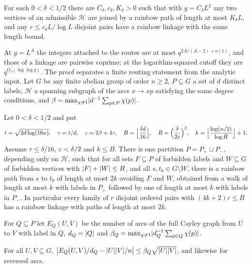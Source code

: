 \begin{corollary}\label{dir:cor:routing}
For each $0<\delta<1/2$ there are $C_\delta,c_\delta,K_\delta>0$ such that with $y=C_\delta L^2$ any two
vertices of an admissible $\mathcal H$ are joined by a rainbow path of length at most $K_\delta L$, and any
$r\le c_\delta L/\log L$ disjoint pairs have a rainbow linkage with the same length bound.
\end{corollary}

At $y=L^A$ the integers attached to the routes are at most $q^{2A/(A-2)+o(1)}$, and those of a linkage
are pairwise coprime; at the logarithm-squared cutoff they are $q^{O_\delta(\log\log q)}$. The proof
separates a finite routing statement from the analytic input. Let $G$ be any finite abelian group of
order $n\ge2$, $P\subseteq G$ a set of $d$ distinct labels, $\mathcal H$ a spanning subgraph of the arcs
$x\to xp$ satisfying the same degree conditions, and $\beta=\max_{\chi\ne1}\lvert d^{-1}\sum_{p\in P}\chi(p)\rvert$.

\begin{theorem}\label{dir:thm:routingfinite}
Let $0<\delta<1/2$ and put
\[
 t=\sqrt{2d\log(16n)},\quad\tau=t/d,\quad\varepsilon=2\beta+4\tau,\quad B=\Bigl\lfloor\frac{\delta d}{16}\Bigr\rfloor,
 \quad R=\Bigl(\frac\delta{2\varepsilon}\Bigr)^2,\quad k=\Bigl\lfloor\frac{\log(n/2)}{\log R}\Bigr\rfloor+1 .
\]
Assume $\tau\le\delta/16$, $\varepsilon<\delta/2$ and $k\le B$. There is one partition $P=P_+\sqcup P_-$, depending
only on $\mathcal H$, such that for all sets $F\subseteq P$ of forbidden labels and $W\subseteq G$ of
forbidden vertices with $\lvert F\rvert+\lvert W\rvert\le B$, and all $s,t_0\in G\setminus W$, there is a rainbow path from
$s$ to $t_0$ of length at most $2k$ avoiding $F$ and $W$, obtained from a walk of length at most $k$ with
labels in $P_+$ followed by one of length at most $k$ with labels in $P_-$. In particular every family of
$r$ disjoint ordered pairs with $(4k+2)r\le B$ has a rainbow linkage with paths of length at most $2k$.
\end{theorem}

For $Q\subseteq P$ let $E_Q(U,V)$ be the number of arcs of the full Cayley graph from $U$ to $V$ with label
in $Q$, $d_Q=\lvert Q\rvert$ and $\beta_Q=\max_{\chi\ne1}\lvert d_Q^{-1}\sum_{p\in Q}\chi(p)\rvert$.

\begin{lemma}\label{dir:lem:mix}
For all $U,V\subseteq G$, $\bigl|E_Q(U,V)/d_Q-\lvert U\rvert\lvert V\rvert/n\bigr|\le\beta_Q\sqrt{\lvert U\rvert\lvert V\rvert}$, and likewise for
reversed arcs.
\end{lemma}

